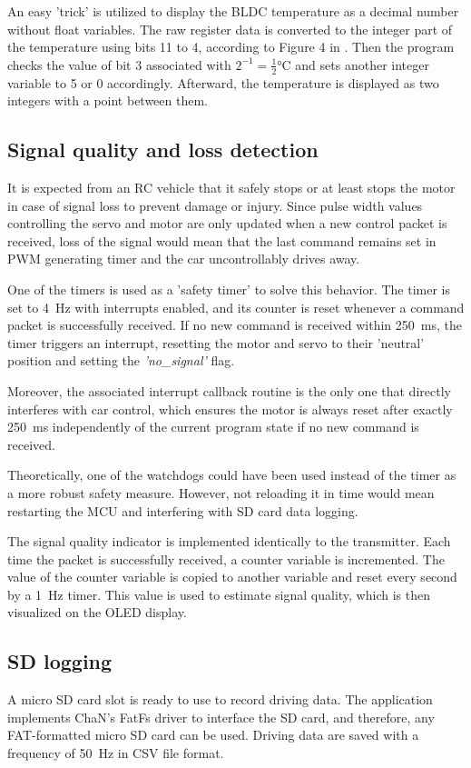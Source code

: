 An easy 'trick' is utilized to display the BLDC temperature as a decimal number without float variables. The raw register data is converted to the integer part of the temperature using bits 11 to 4, according to Figure 4 in \cite{ds_datasheet}. Then the program checks the value of bit 3 associated with $2^{-1} = \frac{1}{2}$\unit{\celsius} and sets another integer variable to 5 or 0 accordingly. Afterward, the temperature is displayed as two integers with a point between them.

\subsection{Signal quality and loss detection}
\label{sub:safety}
It is expected from an RC vehicle that it safely stops or at least stops the motor in case of signal loss to prevent damage or injury. Since pulse width values controlling the servo and motor are only updated when a new control packet is received, loss of the signal would mean that the last command remains set in PWM generating timer and the car uncontrollably drives away.

One of the timers is used as a 'safety timer' to solve this behavior. The timer is set to \SI{4}{\Hz} with interrupts enabled, and its counter is reset whenever a command packet is successfully received. If no new command is received within \SI{250}{\ms}, the timer triggers an interrupt, resetting the motor and servo to their 'neutral' position and setting the \textit{'no\_signal'} flag. 

Moreover, the associated interrupt callback routine is the only one that directly interferes with car control, which ensures the motor is always reset after exactly \SI{250}{\ms} independently of the current program state if no new command is received.

Theoretically, one of the watchdogs could have been used instead of the timer as a more robust safety measure. However, not reloading it in time would mean restarting the MCU and interfering with SD card data logging.

The signal quality indicator is implemented identically to the transmitter. Each time the packet is successfully received, a counter variable is incremented. The value of the counter variable is copied to another variable and reset every second by a \SI{1}{\Hz} timer. This value is used to estimate signal quality, which is then visualized on the OLED display.

\subsection{SD logging}
\label{sub:sd_log}
A micro SD card slot is ready to use to record driving data. The application implements ChaN's FatFs driver to interface the SD card, and therefore, any FAT-formatted micro SD card can be used. Driving data are saved with a frequency of \SI{50}{\Hz} in CSV file format.

